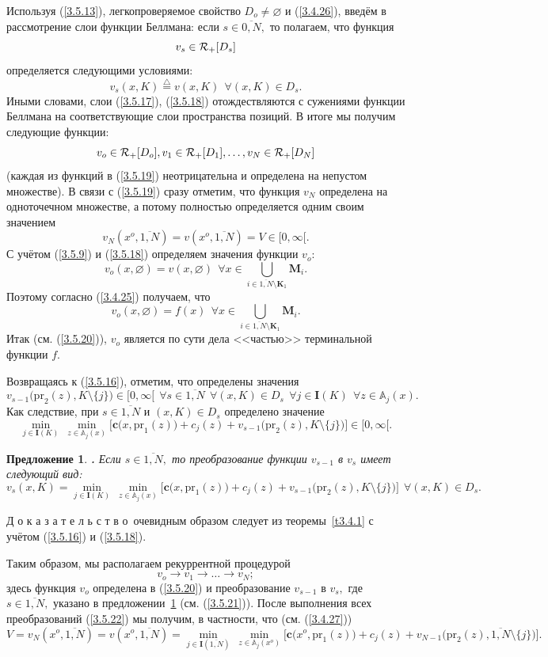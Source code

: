 \documentclass[12pt]{report}
\newcommand{\bfn}{\begin{equation}}
\newcommand{\efn}{\end{equation}}
\newcommand{\df}{\stackrel{\triangle}{=}}
\newcommand{\ov}{\overline}
\newcounter{theo}
\newcounter{pred}
\newtheorem{pred}{Предложение}[section]
\newcommand{\TL}{\mbox{\bf{$\!\!$.}}}
\newcommand{\sm}{\setminus}
\newcommand{\fa}{\forall}
\newcommand{\clr}{{\cal R}}
\newcommand{\bba}{{\mathbb A}}
\newcommand{\emp}{\varnothing}
\begin{document}
{Используя (\ref{3.5.13}), легкопроверяемое свойство $D_o\neq \emp$ и (\ref{3.4.26}), введём
в рассмотрение слои функции Беллмана: если $s\in \ov{0,N},$ то полагаем, что функция
\bfn\label{3.5.17}v_s\in \clr_+[D_s]
\efn
определяется следующими условиями:
\bfn\label{3.5.18}v_s(x,K) \df v(x,K)\ \ \fa (x,K)\in D_s.
\efn
Иными словами, слои (\ref{3.5.17}), (\ref{3.5.18}) отождествляются с сужениями  функции
Беллмана на соответствующие слои пространства позиций. В итоге мы получим следующие функции:
\bfn\label{3.5.19}v_o\in \clr_+[D_o], v_1\in \clr_+[D_1],\ldots,v_N\in \clr_+[D_N]
\efn
(каждая из функций в (\ref{3.5.19}) неотрицательна и определена на непустом множестве).
В связи с (\ref{3.5.19}) сразу отметим, что функция $v_N$ определена на одноточечном множестве,
а потому полностью определяется одним своим значением
$$
v_N(x^o,\ov{1,N})= v(x^o,\ov{1,N}) = V\in [0,\infty[.
$$
С учётом (\ref{3.5.9}) и (\ref{3.5.18}) определяем значения функции $v_o$:
$$
v_o(x,\emp) = v(x,\emp)\ \ \fa x\in \bigcup\limits_{i\in \ov{1,N}\sm \mathbf{K}_1}\mathbf{M}_i.
$$
Поэтому согласно (\ref{3.4.25}) получаем, что
\bfn\label{3.5.20}v_o(x,\emp) = f(x)\ \ \fa x\in \bigcup\limits_{i\in \ov{1,N}\sm
\mathbf{K}_1}\mathbf{M}_i.
\efn
Итак (см. (\ref{3.5.20})), $v_o$ является  по сути дела <<частью>> терминальной функции $f.$

Возвращаясь к (\ref{3.5.16}), отметим, что определены значения
$$v_{s-1}\bigl(\mathrm{pr}_2(z),K\sm\{j\}\bigl)\in [0,\infty[\ \ \fa s \in \ov{1,N}\ \ \fa
(x,K)\in D_s\ \ \fa j\in \mathbf{I}(K)\ \ \fa z\in \bba_j(x).$$
Как следствие, при $s\in \ov{1,N}$ и $(x,K)\in D_s$ определено значение
$$\min\limits_{j\in\mathbf{I}(K)}\ \min\limits_{z\in \bba_j(x)}\bigl[\mathbf{c}\bigl(x,
\mathrm{pr}_1(z)\bigl) + c_j(z) + v_{s-1}\bigl(\mathrm{pr}_2(z),K\sm\{j\}\bigl)\bigl]\in [0,\infty[.
$$
\begin{pred}\label{p3.5.1}{\TL} Если $s\in \ov{1,N},$ то преобразование функции
$v_{s-1}$ в $v_s$ имеет следующий вид:
\bfn\label{3.5.21}v_s(x,K) = \min\limits_{j\in \mathbf{I}(K)}\ \min\limits_{z\in \bba_j(x)}
\bigl[\mathbf{c}\bigl(x,\mathrm{pr}_1(z)\bigl) + c_j(z) + v_{s-1}\bigl(\mathrm{pr}_2(z),
K\sm\{j\}\bigl)\bigl]\ \ \fa (x,K) \in D_s.
\efn
\end{pred}

Д о к а з а т е л ь с т в о\, очевидным образом следует из теоремы~\ref{t3.4.1} с учётом
(\ref{3.5.16}) и (\ref{3.5.18}).

Таким образом, мы располагаем рекуррентной процедурой
\bfn\label{3.5.22}v_o \longrightarrow v_1 \longrightarrow \ldots \longrightarrow v_N;
\efn
здесь функция $v_o$ определена в (\ref{3.5.20}) и преобразование $v_{s-1}$ в $v_s,$
где $s\in \ov{1,N},$ указано в предложении~\ref{p3.5.1} (см. (\ref{3.5.21})). После
выполнения всех преобразований (\ref{3.5.22}) мы получим, в частности, что (см. (\ref{3.4.27}))
\bfn\label{3.5.23}V = v_N(x^o,\ov{1,N}) = v(x^o,\ov{1,N}) = \min\limits_{j\in \mathbf{I}(\overline{1,N})}\
\min\limits_{z\in \bba_j(x^o)} \bigl[\mathbf{c}\bigl(x^o,\mathrm{pr}_1(z)\bigl) + c_j(z) +
v_{N-1}\bigl(\mathrm{pr}_2(z),\ov{1,N}\sm\{j\}\bigl)\bigl].
\efn

}
\end{document}
